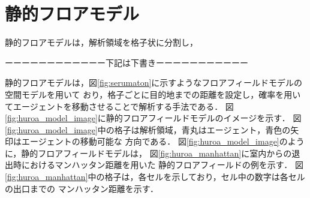 \section{静的フロアモデル}
静的フロアモデルは，解析領域を格子状に分割し，

ーーーーーーーーーーーー下記は下書きーーーーーーーーーーー

静的フロアモデルは，図\ref{fig:serumaton}に示すようなフロアフィールドモデルの空間モデルを用いて
おり，格子ごとに目的地までの距離を設定し，確率を用いてエージェントを移動させることで解析する手法である．
図\ref{fig:huroa_model_image}に静的フロアフィールドモデルのイメージを示す．
図\ref{fig:huroa_model_image}中の格子は解析領域，青丸はエージェント，青色の矢印はエージェントの移動可能な
方向である．
図\ref{fig:huroa_model_image}のように，静的フロアフィールドモデルは，
図\ref{fig:huroa_manhattan}に室内からの退出時におけるマンハッタン距離を用いた
静的フロアフィールドの例を示す．
図\ref{fig:huroa_manhattan}中の格子は，各セルを示しており，セル中の数字は各セルの出口までの
マンハッタン距離を示す．



